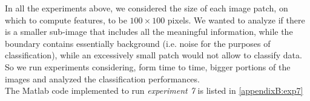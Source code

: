 In all the experiments above, we considered the size of each image patch, on which to compute features, to be $100\times100$ pixels.
We wanted to analyze if there is a smaller sub-image that includes all the meaningful information, while the boundary contains essentially background (i.e. noise for the
purposes of classification), while an excessively small patch would not allow to classify data.\\
So we run experiments considering, form time to time, bigger portions of the images and analyzed the classification performances.
\\
The Matlab code implemented to run \textit{experiment 7} is listed in \ref{appendixB:exp7}



\vspace{0.5cm}





 


